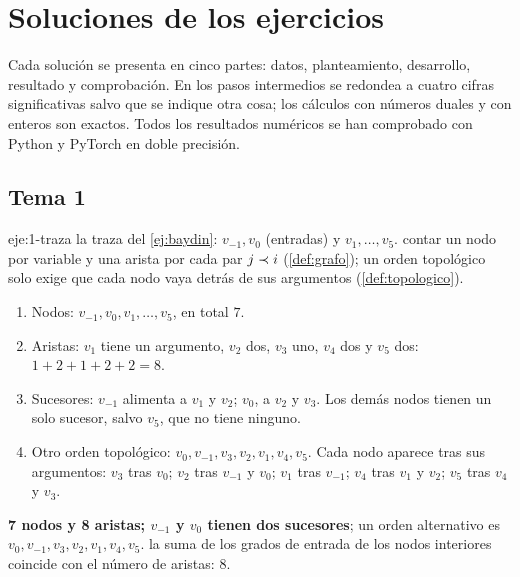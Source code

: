 \chapter{Soluciones de los ejercicios}
\label{ap:soluciones}

Cada solución se presenta en cinco partes: datos, planteamiento, desarrollo, resultado y comprobación. En los pasos intermedios se redondea a cuatro cifras significativas salvo que se indique otra cosa; los cálculos con números duales y con enteros son exactos. Todos los resultados numéricos se han comprobado con Python y PyTorch en doble precisión.

\section{Tema 1}

\begin{solucion}{eje:1-traza}
\datos la traza del \cref{ej:baydin}: $v_{-1},v_0$ (entradas) y $v_1,\dots,v_5$.
\planteamiento contar un nodo por variable y una arista por cada par $j\prec i$ (\cref{def:grafo}); un orden topológico solo exige que cada nodo vaya detrás de sus argumentos (\cref{def:topologico}).
\pasos
\begin{enumerate}[label=\arabic*.]
  \item Nodos: $v_{-1},v_0,v_1,\dots,v_5$, en total $7$.
  \item Aristas: $v_1$ tiene un argumento, $v_2$ dos, $v_3$ uno, $v_4$ dos y $v_5$ dos: $1+2+1+2+2=8$.
  \item Sucesores: $v_{-1}$ alimenta a $v_1$ y $v_2$; $v_0$, a $v_2$ y $v_3$. Los demás nodos tienen un solo sucesor, salvo $v_5$, que no tiene ninguno.
  \item Otro orden topológico: $v_0,v_{-1},v_3,v_2,v_1,v_4,v_5$. Cada nodo aparece tras sus argumentos: $v_3$ tras $v_0$; $v_2$ tras $v_{-1}$ y $v_0$; $v_1$ tras $v_{-1}$; $v_4$ tras $v_1$ y $v_2$; $v_5$ tras $v_4$ y $v_3$.
\end{enumerate}
\resultado \textbf{7 nodos y 8 aristas; $v_{-1}$ y $v_0$ tienen dos sucesores}; un orden alternativo es $v_0,v_{-1},v_3,v_2,v_1,v_4,v_5$.
\comprobacion la suma de los grados de entrada de los nodos interiores coincide con el número de aristas: $8$.
\end{solucion}

